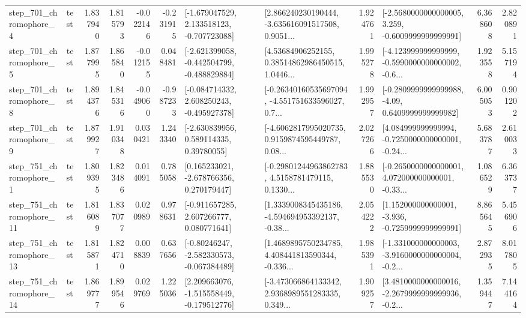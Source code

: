 \begin{tabular}{llrrrrllrlrr}
   step\_701\_chromophore\_4 &      test &      1.837940 &    1.815793 &     -0.022146 & -0.231915 &   [-1.679047529, 2.133518123, -0.707723088] &  [2.866240230190444, -3.635616091517508, 0.9051... &       1.924761 &  [-2.5680000000000005, 3.259, -0.6009999999999991] &            6.368608 &          2.820891 \\
   step\_701\_chromophore\_5 &      test &      1.877995 &    1.865840 &     -0.012155 &  0.048481 &  [-2.621399058, -0.442504799, -0.488829884] &  [4.53684906252155, 0.38514862986450515, 1.0446... &       1.995278 &  [-4.123999999999999, -0.5990000000000002, -0.6... &            1.923558 &          5.157194 \\
   step\_701\_chromophore\_8 &      test &      1.894376 &    1.845316 &     -0.049060 & -0.987233 &   [-0.084714332, 2.608250243, -0.495927378] &  [-0.26340160535697094, -4.551751633596027, 0.7... &       1.992957 &   [-0.2809999999999988, -4.09, 0.6409999999999982] &            6.005053 &          0.901202 \\
   step\_701\_chromophore\_9 &      test &      1.879927 &    1.910348 &      0.030421 &  1.243340 &     [-2.630839956, 0.589114335, 0.39780055] &  [-4.6062817995020735, 0.9159874595449787, 0.08... &       2.027266 &  [4.084999999999994, -0.7250000000000001, -0.24... &            5.683787 &          2.610033 \\
   step\_751\_chromophore\_1 &      test &      1.809395 &    1.823486 &      0.014091 &  0.785058 &    [0.165233021, -2.678766356, 0.270179447] &  [-0.29801244963862783, 4.5158781479115, 0.1330... &       1.885530 &  [-0.2650000000000001, 4.072000000000001, -0.33... &            1.086529 &          6.363737 \\
  step\_751\_chromophore\_11 &      test &      1.816089 &    1.837077 &      0.020989 &  0.978631 &    [-0.911657285, 2.607266777, 0.080771641] &  [1.3339008345435186, -4.594694953392137, -0.38... &       2.054222 &   [1.152000000000001, -3.936, -0.7259999999999991] &            8.865645 &          5.456906 \\
  step\_751\_chromophore\_13 &      test &      1.815871 &    1.824710 &      0.008839 &  0.637656 &   [-0.80246247, -2.582330573, -0.067384489] &  [1.4689895750234785, 4.408441813590344, -0.336... &       1.985391 &  [-1.331000000000003, -3.9160000000000004, -0.2... &            2.872935 &          8.017805 \\
  step\_751\_chromophore\_14 &      test &      1.869777 &    1.899546 &      0.029769 &  1.225036 &   [2.209663076, -1.515558449, -0.179512776] &  [-3.473066864133342, 2.9368989551283335, 0.349... &       1.909257 &  [3.4810000000000016, -2.2679999999999936, -0.2... &            1.359447 &          7.144164 \\

\end{tabular}
